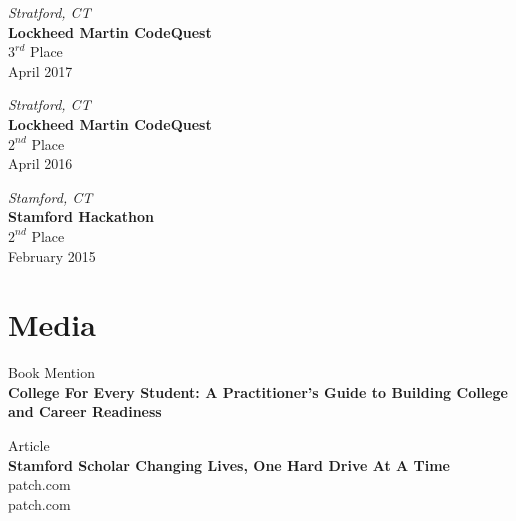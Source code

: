 \documentclass[letterpaper,11pt]{article}
\newcommand{\Award}[4]{%
  \vbox{%
    \footnotesize \textit{#1} \normalsize
    \\ \textbf{#2}
    \\ #3
    \\ \footnotesize #4 \normalsize
  }
}
\newcommand{\Media}[3]{
  \vbox{%
    #1
    \\ \textbf{#2}
    \def\temp{#3}\ifx\temp\empty
    \else
      \\ #3
    \fi
  }
}
\begin{document}
\Award{Stratford, CT}{Lockheed Martin CodeQuest}{$3^{rd}$ Place}{April 2017}

\vspace{1cm}

\Award{Stratford, CT}{Lockheed Martin CodeQuest}{$2^{nd}$ Place}{April 2016}

\vspace{1cm}

\Award{Stamford, CT}{Stamford Hackathon}{$2^{nd}$ Place}{February 2015}

\section{Media}

\Media{Book Mention}{College For Every Student: A Practitioner’s Guide to
  Building College and Career Readiness}{}

\vspace{0.5cm}

\Media{Article}{Stamford Scholar Changing Lives, One Hard Drive At A Time}{patch.com}
\end{document}
